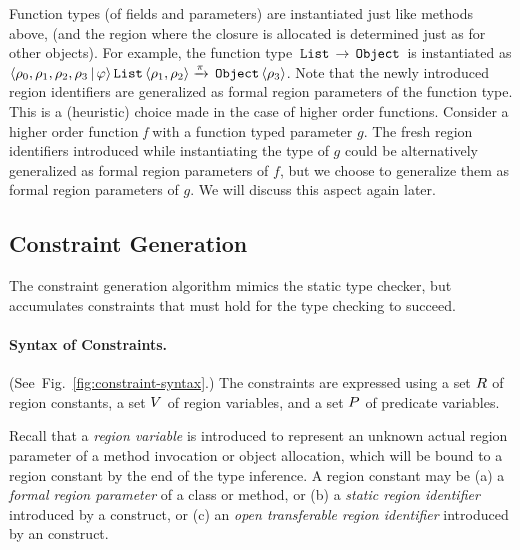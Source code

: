 Function types (of fields and parameters) are instantiated just like methods above,
(and the region where the closure is allocated is determined just as for other objects).
For example, the function type $\,{\tt List}\, \rightarrow \,{\tt Object}\,$ is instantiated as
$\langle \rho_0, \rho_1, \rho_2, \rho_3 \,|\, \varphi  \rangle \,{\tt List}\, \langle \rho_1,\rho_2 \rangle \xrightarrow{\pi} \,{\tt Object}\,\langle \rho_3 \rangle$.
Note that the newly introduced region identifiers are generalized as formal region parameters of the function type.
This is a (heuristic) choice made in the case of higher order functions.
Consider a higher order function \emph{f} with a function typed parameter $g$.
The fresh region identifiers introduced while instantiating the type of $g$ could be
alternatively generalized as formal region parameters of $f$, but we choose to
generalize them as formal region parameters of $g$.
We will discuss this aspect again later.

\subsection{Constraint Generation}
\label{sec:fb-constraintsem}

The constraint generation algorithm mimics the static type checker, but accumulates
constraints that must hold for the type checking to succeed.

\paragraph{Syntax of Constraints.}
(See~Fig.~\ref{fig:constraint-syntax}.)
The constraints are expressed using a set $R$ of region constants,
a set $V$ of region variables, and a set $P$ of predicate variables.



Recall that a \emph{region variable} is introduced to represent an unknown actual region parameter
of a method invocation or object allocation, which will be bound to a region constant by the end of the
type inference.
A region constant may be 
(a) a \emph{formal region parameter} of a class or method, or
(b) a \emph{static region identifier} introduced by a  construct, or
(c) an  \emph{open transferable region identifier} introduced by an  construct.

